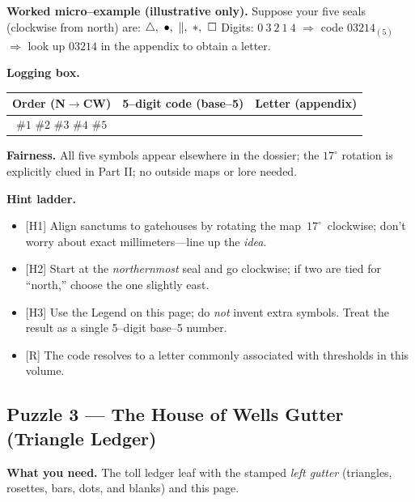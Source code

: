 \documentclass[11pt]{article}
\numberwithin{equation}{section} %
\theoremstyle{plain} %
\theoremstyle{definition} %
\theoremstyle{remark} %
\begin{document}
\medskip
\noindent\textbf{Worked micro–example (illustrative only).}  
Suppose your five seals (clockwise from north) are: \(\triangle,\ \bullet,\ \Vert,\ \large\ast,\ \square\)  
Digits: \(0\ 3\ 2\ 1\ 4\) \(\Rightarrow\) code \(03214_{(5)}\) \(\Rightarrow\) look up \(03214\) in the appendix to obtain a letter.

\medskip
\noindent\textbf{Logging box.}
\begin{center}
\begin{tabular}{c|c|c}
\textbf{Order (N\(\rightarrow\)CW)} & \textbf{5–digit code (base–5)} & \textbf{Letter (appendix)} \\
\hline
\(\#1\) \(\#2\) \(\#3\) \(\#4\) \(\#5\) & \hspace{3.5cm} & \hspace{1.2cm} \\
\end{tabular}
\end{center}

\medskip
\noindent\textbf{Fairness.} All five symbols appear elsewhere in the dossier; the \(17^\circ\) rotation is explicitly clued in Part II; no outside maps or lore needed.

\medskip
\noindent\textbf{Hint ladder.}
\begin{itemize}\setlength\itemsep{0.25em}
  \item \textsc{[H1]} Align sanctums to gatehouses by rotating the map \(\,17^\circ\,\) clockwise; don’t worry about exact millimeters—line up the \emph{idea}.
  \item \textsc{[H2]} Start at the \emph{northernmost} seal and go clockwise; if two are tied for “north,” choose the one slightly east.
  \item \textsc{[H3]} Use the Legend on this page; do \emph{not} invent extra symbols. Treat the result as a single 5–digit base–5 number.
  \item \textsc{[R]} The code resolves to a letter commonly associated with thresholds in this volume.
\end{itemize}

\subsection{Puzzle 3 — The House of Wells Gutter (Triangle Ledger)}
\label{pz:triangle-ledger}

\noindent\textbf{What you need.} The toll ledger leaf with the stamped \emph{left gutter} (triangles, rosettes, bars, dots, and blanks) and this page.
\end{document}
